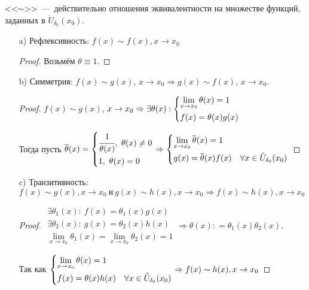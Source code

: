 \begin{note}
    <<$\sim$>>~---~действительно отношения эквивалентности на множестве функций, заданных в $\mathring U_{\delta_{0}}(x_{0}).$
    \begin{enumerate}
        \item[a)] Рефлексивность:  $f(x) \sim f(x), x\to x_{0}$ 
        
    \begin{proof}
        Возьмём $\theta \equiv 1$.
    \end{proof}
        \item[b)] Симметрия: $f(x) \sim g(x)$, $x\to x_{0} \Rightarrow g(x) \sim f(x)$, $x\to x_{0}.$
    \begin{proof}
        $f(x) \sim g(x)$, $x\to x_{0} \Rightarrow \exists \theta(x): \left\{ \begin{gathered}
        \lim\limits_{x \to x_{0}} \theta(x)= 1 \hfill \\
        f(x) = \theta(x) g(x) \hfill
        \end{gathered} \right.$ 

        Тогда пусть $\overline{\theta}(x) = \left\{ \begin{gathered}
            \cfrac{1}{\theta(x)}, \ \theta(x)\neq 0 \hfill \\
            1, \ \theta (x) =  0 \hfill
        \end{gathered} \right.
        \Rightarrow \left\{
        \begin{gathered}
        \lim\limits_{x\to x_{0}} \overline{\theta}(x) = 1 \hfill \\
        g(x) = \overline{\theta }(x) f(x) \quad \forall x\in \mathring{U}_{\delta_{0}}(x_{0}) 
        \end{gathered} \right.$
    \end{proof}
            \item[c)] Транзитивность: $f(x) \sim g(x), x\to x_{0} \ \textrm{и}\ g(x) \sim h(x),  x\to x_{0} \Rightarrow f(x) \sim h(x), x\to x_{0}$

    \begin{proof}
        $
        \begin{gathered}
            \exists \theta_{1}(x): \ f(x) = \theta_{1}(x) g(x) \\
            \exists \theta_{2}(x): \ g(x) = \theta_{2}(x) h(x) \\
            \lim\limits_{x \to x_{0}}\theta_{1}(x)= \lim\limits_{x \to x_{0}}\theta_{2}(x)= 1
        \end{gathered} 
        \Rightarrow \theta(x): = \theta_{1}(x)\theta_{2}(x),
        $
        
        Так как $
        \left\{ \begin{gathered}
        \lim\limits_{x \to x_{0}} \theta(x)= 1 \hfill \\
        f(x) = \theta(x) h(x) \quad \forall x\in \mathring{U}_{\delta_{0}}(x_{0})\hfill
        \end{gathered} \right.
        \Rightarrow
        f(x) \sim h(x), x\to x_{0}
        $      
    \end{proof}
    \end{enumerate}
\end{note}

